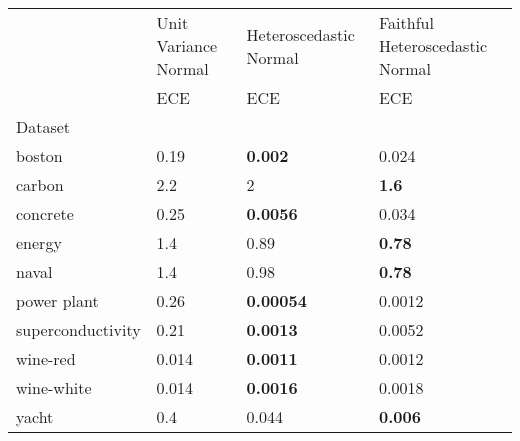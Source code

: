 \begin{tabular}{l|l|l|l}
\toprule
 & Unit Variance Normal & Heteroscedastic Normal & Faithful Heteroscedastic Normal \\
 & ECE & ECE & ECE \\
Dataset &  &  &  \\
\midrule
boston & 0.19 & \bfseries 0.002 & 0.024 \\
carbon & 2.2 & 2 & \bfseries 1.6 \\
concrete & 0.25 & \bfseries 0.0056 & 0.034 \\
energy & 1.4 & 0.89 & \bfseries 0.78 \\
naval & 1.4 & 0.98 & \bfseries 0.78 \\
power plant & 0.26 & \bfseries 0.00054 & 0.0012 \\
superconductivity & 0.21 & \bfseries 0.0013 & 0.0052 \\
wine-red & 0.014 & \bfseries 0.0011 & 0.0012 \\
wine-white & 0.014 & \bfseries 0.0016 & 0.0018 \\
yacht & 0.4 & 0.044 & \bfseries 0.006 \\
\bottomrule
\end{tabular}
